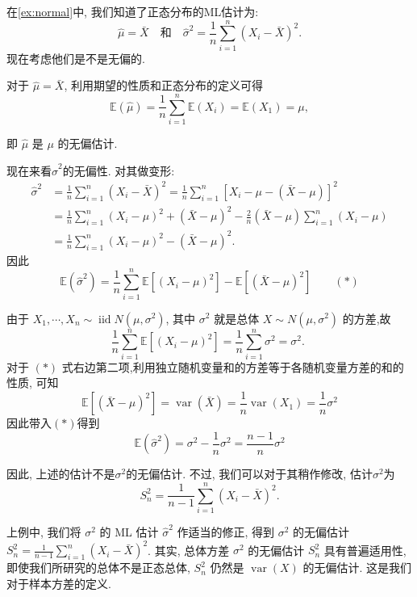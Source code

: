 \begin{example}
    在\cref{ex:normal}中, 我们知道了正态分布的ML估计为: 
    $$\hat{\mu}=\bar{X} \quad \text{和} \quad \hat{\sigma}^2=\frac{1}{n} \sum_{i=1}^n\left(X_i-\bar{X}\right)^2.$$
    现在考虑他们是不是无偏的. 

    对于 $\hat{\mu}=\bar{X}$, 利用期望的性质和正态分布的定义可得
$$
\mathbb{E}(\hat{\mu})=\frac{1}{n} \sum_{i=1}^n \mathbb{E}\left(X_i\right)=\mathbb{E}\left(X_1\right)=\mu,
$$

即 $\hat{\mu}$ 是 $\mu$ 的无偏估计.

现在来看$\hat\sigma^2$的无偏性. 对其做变形: 
$$\begin{aligned} \hat{\sigma}^2 & =\frac{1}{n} \sum_{i=1}^n\left(X_i-\bar{X}\right)^2=\frac{1}{n} \sum_{i=1}^n\left[X_i-\mu-(\bar{X}-\mu)\right]^2 \\ & =\frac{1}{n} \sum_{i=1}^n\left(X_i-\mu\right)^2+(\bar{X}-\mu)^2-\frac{2}{n}(\bar{X}-\mu) \sum_{i=1}^n\left(X_i-\mu\right) \\ & =\frac{1}{n} \sum_{i=1}^n\left(X_i-\mu\right)^2-(\bar{X}-\mu)^2 .\end{aligned}$$
因此
$$\mathbb{E}\left(\hat{\sigma}^2\right)=\frac{1}{n} \sum_{i=1}^n \mathbb{E}\left[\left(X_i-\mu\right)^2\right]-\mathbb{E}\left[(\bar{X}-\mu)^2\right]\qquad(*)$$

由于 $X_1, \cdots, X_n \sim \operatorname{iid} N\left(\mu, \sigma^2\right)$, 其中 $\sigma^2$ 就是总体 $X \sim N\left(\mu, \sigma^2\right)$ 的方差,故
$$
\frac{1}{n} \sum_{i=1}^n \mathbb{E}\left[\left(X_i-\mu\right)^2\right]=\frac{1}{n} \sum_{i=1}^n \sigma^2=\sigma^2 \text {. }
$$
对于 $(*)$ 式右边第二项,利用独立随机变量和的方差等于各随机变量方差的和的性质, 可知
$$
\mathbb{E}\left[(\bar{X}-\mu)^2\right]=\operatorname{var}(\bar{X})=\frac{1}{n} \operatorname{var}\left(X_1\right)=\frac{1}{n} \sigma^2
$$
因此带入$(*)$得到
$$\mathbb{E}\left(\hat{\sigma}^2\right)=\sigma^2-\frac{1}{n} \sigma^2=\frac{n-1}{n} \sigma^2$$

因此, 上述的估计不是$\sigma^2$的无偏估计. 不过, 我们可以对于其稍作修改, 估计$\sigma^2$为$$S_n^2=\frac{1}{n-1} \sum_{i=1}^n\left(X_i-\bar{X}\right)^2.$$
\end{example}

上例中, 我们将 $\sigma^2$ 的 ML 估计 $\hat{\sigma}^2$ 作适当的修正, 得到 $\sigma^2$ 的无偏估计 $S_n^2=\frac{1}{n-1} \sum_{i=1}^n\left(X_i-\bar{X}\right)^2$. 其实, 总体方差 $\sigma^2$ 的无偏估计 $S_n^2$ 具有普遍适用性, 即使我们所研究的总体不是正态总体, $S_n^2$ 仍然是 $\operatorname{var}(X)$ 的无偏估计. 这是我们对于样本方差的定义. 

